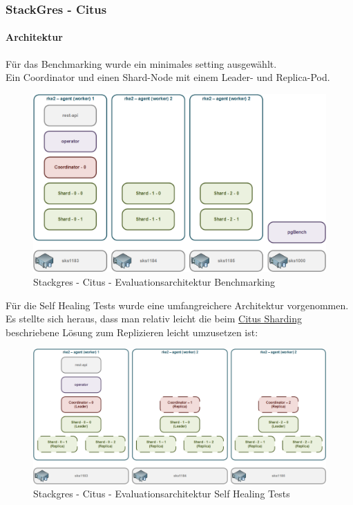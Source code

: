 
\begin{flushleft}
    \subsubsection{StackGres - Citus}
    \paragraph{Architektur}
    Für das Benchmarking wurde ein minimales setting ausgewählt.\\
    Ein Coordinator und einen Shard-Node mit einem Leader- und Replica-Pod.\\
    \begin{figure}[H]
        \centering
        \includegraphics[width=0.8\linewidth]{source/implementation/evaluation/postgresql_ha_solutions/stackgres/stackgres-citus-evaluation-architecture}
        \caption{Stackgres - Citus - Evaluationsarchitektur Benchmarking}
        \label{fig:stackgres-citus-evaluation-architecture}
    \end{figure}
    Für die Self Healing Tests wurde eine umfangreichere Architektur vorgenommen.\\
    Es stellte sich heraus, dass man relativ leicht die beim \hyperref[subpar:citus_sharding]{Citus Sharding} beschriebene Lösung zum Replizieren leicht umzusetzen ist:
    \begin{figure}[H]
        \centering
        \includegraphics[width=0.8\linewidth]{source/implementation/evaluation/postgresql_ha_solutions/stackgres/stackgres_citus_architecture_self_healing_test}
        \caption{Stackgres - Citus - Evaluationsarchitektur Self Healing Tests}
        \label{fig:stackgres_citus_architecture_self_healing_test}
    \end{figure}
\end{flushleft}
